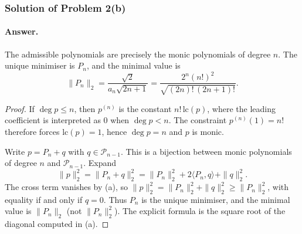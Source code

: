 \documentclass[11pt,a4paper]{article}
\begin{document}
\subsubsection{Solution of Problem 2(b)}

\paragraph{Answer.}
The admissible polynomials are precisely the monic polynomials of degree \(n\). The unique minimiser is \(P_{n}\), and the minimal value is
\[
\|P_{n}\|_{2}
=
\frac{\sqrt{2}}{a_{n}\sqrt{2n+1}}
=
\frac{2^{n}(n!)^{2}}{\sqrt{(2n)!\,(2n+1)!}}.
\]

\begin{proof}
If \(\deg p\le n\), then \(p^{(n)}\) is the constant \(n!\,\mathrm{lc}(p)\), where the leading coefficient is interpreted as \(0\) when \(\deg p<n\). The constraint \(p^{(n)}(1)=n!\) therefore forces \(\mathrm{lc}(p)=1\), hence \(\deg p=n\) and \(p\) is monic.

Write \(p=P_{n}+q\) with \(q\in\mathcal{P}_{n-1}\). This is a bijection between monic polynomials of degree \(n\) and \(\mathcal{P}_{n-1}\). Expand
\[
\|p\|_{2}^{2}
=
\|P_{n}+q\|_{2}^{2}
=
\|P_{n}\|_{2}^{2}+2\langle P_{n},q\rangle+\|q\|_{2}^{2}.
\]
The cross term vanishes by (a), so \(\|p\|_{2}^{2}=\|P_{n}\|_{2}^{2}+\|q\|_{2}^{2}\ge\|P_{n}\|_{2}^{2}\), with equality if and only if \(q=0\). Thus \(P_{n}\) is the unique minimiser, and the minimal value is \(\|P_{n}\|_{2}\) (not \(\|P_{n}\|_{2}^{2}\)). The explicit formula is the square root of the diagonal computed in (a).
\end{proof}
\end{document}
